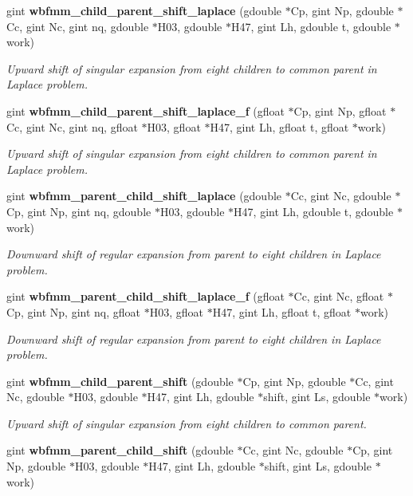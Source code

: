 \begin{DoxyCompactItemize}
gint {\bf wbfmm\+\_\+child\+\_\+parent\+\_\+shift\+\_\+laplace} (gdouble $\ast$Cp, gint Np, gdouble $\ast$Cc, gint Nc, gint nq, gdouble $\ast$H03, gdouble $\ast$H47, gint Lh, gdouble t, gdouble $\ast$work)
\begin{DoxyCompactList}\small\item\em Upward shift of singular expansion from eight children to common parent in Laplace problem. \end{DoxyCompactList}\item 
gint {\bf wbfmm\+\_\+child\+\_\+parent\+\_\+shift\+\_\+laplace\+\_\+f} (gfloat $\ast$Cp, gint Np, gfloat $\ast$Cc, gint Nc, gint nq, gfloat $\ast$H03, gfloat $\ast$H47, gint Lh, gfloat t, gfloat $\ast$work)
\begin{DoxyCompactList}\small\item\em Upward shift of singular expansion from eight children to common parent in Laplace problem. \end{DoxyCompactList}\item 
gint {\bf wbfmm\+\_\+parent\+\_\+child\+\_\+shift\+\_\+laplace} (gdouble $\ast$Cc, gint Nc, gdouble $\ast$Cp, gint Np, gint nq, gdouble $\ast$H03, gdouble $\ast$H47, gint Lh, gdouble t, gdouble $\ast$work)
\begin{DoxyCompactList}\small\item\em Downward shift of regular expansion from parent to eight children in Laplace problem. \end{DoxyCompactList}\item 
gint {\bf wbfmm\+\_\+parent\+\_\+child\+\_\+shift\+\_\+laplace\+\_\+f} (gfloat $\ast$Cc, gint Nc, gfloat $\ast$Cp, gint Np, gint nq, gfloat $\ast$H03, gfloat $\ast$H47, gint Lh, gfloat t, gfloat $\ast$work)
\begin{DoxyCompactList}\small\item\em Downward shift of regular expansion from parent to eight children in Laplace problem. \end{DoxyCompactList}\item 
gint {\bf wbfmm\+\_\+child\+\_\+parent\+\_\+shift} (gdouble $\ast$Cp, gint Np, gdouble $\ast$Cc, gint Nc, gdouble $\ast$H03, gdouble $\ast$H47, gint Lh, gdouble $\ast$shift, gint Ls, gdouble $\ast$work)
\begin{DoxyCompactList}\small\item\em Upward shift of singular expansion from eight children to common parent. \end{DoxyCompactList}\item 
gint {\bf wbfmm\+\_\+parent\+\_\+child\+\_\+shift} (gdouble $\ast$Cc, gint Nc, gdouble $\ast$Cp, gint Np, gdouble $\ast$H03, gdouble $\ast$H47, gint Lh, gdouble $\ast$shift, gint Ls, gdouble $\ast$work)

\end{DoxyCompactItemize}
